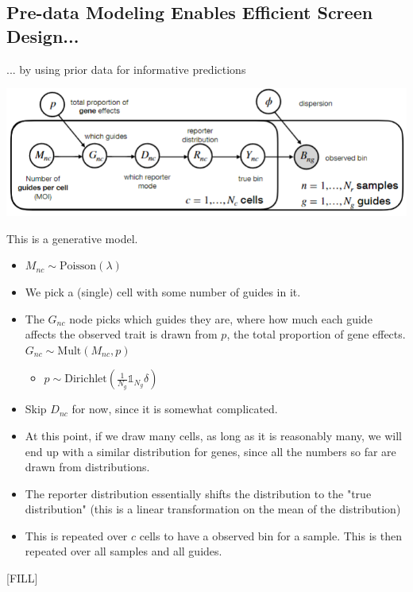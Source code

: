 \documentclass[10pt]{article}
\begin{document}
\subsection*{Pre-data Modeling Enables Efficient Screen Design...}
... by using prior data for informative predictions
\begin{center}
    \includegraphics*[scale=0.8]{W9_6.png}
\end{center}
This is a generative model.
\begin{itemize}
    \item $M_{nc} \sim \text{Poisson}(\lambda)$
    \item We pick a (single) cell with some number of guides in it.
    \item The $G_{nc}$ node picks which guides they are, where how much each guide affects the observed trait is drawn from $p$, the total proportion of gene effects.  $G_{nc} \sim \text{Mult}(M_{nc}, p)$
    \begin{itemize}
        \item $p \sim \text{Dirichlet}(\frac{1}{N_g} \mathds{1}_{N_g}\delta)$
    \end{itemize}
    \item Skip $D_{nc}$ for now, since it is somewhat complicated.
    \item At this point, if we draw many cells, as long as it is reasonably many, we will end up with a similar distribution for genes, since all the numbers so far are drawn from distributions.
    \item The reporter distribution essentially shifts the distribution to the "true distribution"  (this is a linear transformation on the mean of the distribution)
    \item This is repeated over $c$ cells to have a observed bin for a sample.  This is then repeated over all samples and all guides.
\end{itemize}
[FILL]
\end{document}
